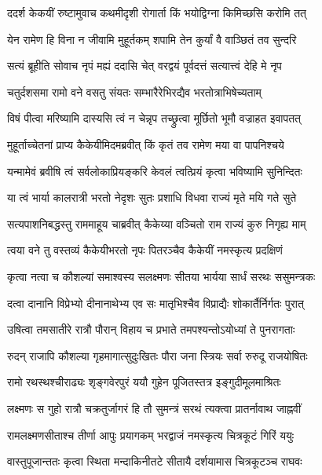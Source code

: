 \twolineshloka
{ददर्श केकयीं रुष्टामुवाच कथमीदृशी}
{रोगार्ता किं भयोद्विग्ना किमिच्छसि करोमि तत्} %

\twolineshloka
{येन रामेण हि विना न जीवामि मुहूर्तकम्}
{शपामि तेन कुर्यां वै वाञ्छितं तव सुन्दरि} %

\twolineshloka
{सत्यं ब्रूहीति सोवाच नृपं मह्यं ददासि चेत्}
{वरद्वयं पूर्वदत्तं सत्यात्त्वं देहि मे नृप} %

\twolineshloka
{चतुर्दशसमा रामो वने वसतु संयतः}
{सम्भारैरेभिरद्यैव भरतोत्राभिषेच्यताम्} %

\twolineshloka
{विषं पीत्वा मरिष्यामि दास्यसि त्वं न चेन्नृप}
{तच्छ्रुत्वा मूर्छितो भूमौ वज्राहत इवापतत्} %

\twolineshloka
{मुहूर्ताच्चेतनां प्राप्य कैकेयीमिदमब्रवीत्}
{किं कृतं तव रामेण मया वा पापनिश्चये} %

\twolineshloka
{यन्मामेवं ब्रवीषि त्वं सर्वलोकाप्रियङ्करि}
{केवलं त्वत्प्रियं कृत्वा भविष्यामि सुनिन्दितः} %

\twolineshloka
{या त्वं भार्या कालरात्री भरतो नेदृशः सुतः}
{प्रशाधि विधवा राज्यं मृते मयि गते सुते} %

\twolineshloka
{सत्यपाशनिबद्धस्तु राममाहूय चाब्रवीत्}
{कैकेय्या वञ्चितो राम राज्यं कुरु निगृह्य माम्} %

\twolineshloka
{त्वया वने तु वस्तव्यं कैकेयीभरतो नृपः}
{पितरञ्चैव कैकेयीं नमस्कृत्य प्रदक्षिणं} %

\twolineshloka
{कृत्वा नत्वा च कौशल्यां समाश्वस्य सलक्ष्मणः}
{सीतया भार्यया सार्धं सरथः ससुमन्त्रकः} %

\twolineshloka
{दत्वा दानानि विप्रेभ्यो दीनानाथेभ्य एव सः}
{मातृभिश्चैव विप्राद्यैः शोकार्तैर्निर्गतः पुरात्} %

\twolineshloka
{उषित्वा तमसातीरे रात्रौ पौरान् विहाय च}
{प्रभाते तमपश्यन्तोऽयोध्यां ते पुनरागताः} %

\twolineshloka
{रुदन् राजापि कौशल्या गृहमागात्सुदुःखितः}
{पौरा जना स्त्रियः सर्वा रुरुदू राजयोषितः} %

\twolineshloka
{रामो रथस्थश्चीराढ्यः शृङ्गवेरपुरं ययौ}
{गुहेन पूजितस्तत्र इङ्गुदीमूलमाश्रितः} %

\twolineshloka
{लक्ष्मणः स गुहो रात्रौ चक्रतुर्जागरं हि तौ}
{सुमन्त्रं सरथं त्यक्त्वा प्रातर्नावाथ जाह्नवीं} %

\twolineshloka
{रामलक्ष्मणसीताश्च तीर्णा आपुः प्रयागकम्}
{भरद्वाजं नमस्कृत्य चित्रकूटं गिरिं ययुः} %

\twolineshloka
{वास्तुपूजान्ततः कृत्वा स्थिता मन्दाकिनीतटे}
{सीतायै दर्शयामास चित्रकूटञ्च राघवः} %

